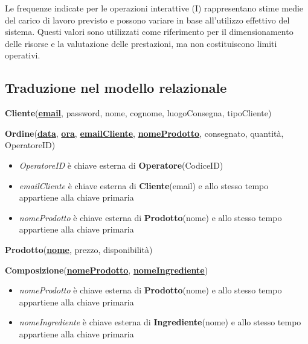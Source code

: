 \documentclass[12pt,a4paper]{article}
\begin{document}
    \FloatBarrier
    \begin{tcolorbox}[
        colback=yellow!10, 
        colframe=yellow!50!black, 
        title=\faExclamationTriangle \quad Nota 
    ]
        Le frequenze indicate per le operazioni interattive (I) rappresentano stime medie del carico di lavoro previsto e possono variare in base all'utilizzo effettivo del sistema. Questi valori sono utilizzati come riferimento per il dimensionamento delle risorse e la valutazione delle prestazioni, ma non costituiscono limiti operativi.
    \end{tcolorbox}
    
    \subsection{Traduzione nel modello relazionale}
    \begin{tcolorbox}[
        colback=gray!8,
        colframe=black!30,
        title=
    ]
        \textbf{Cliente}(\textbf{\uline{email}}, password, nome, cognome, luogoConsegna, tipoCliente)
    \end{tcolorbox}

    \begin{tcolorbox}[
        colback=gray!8,
        colframe=black!30,
        title=
    ]
        \textbf{Ordine}(\uline{\textbf{data}}, \textbf{\uline{ora}}, \textbf{\uline{emailCliente}}, \textbf{\uline{nomeProdotto}}, consegnato, quantità, OperatoreID)
        \begin{itemize}[leftmargin=1em]
            \item \textit{OperatoreID} è chiave esterna di \textbf{Operatore}(CodiceID)
            \item \textit{emailCliente} è chiave esterna di \textbf{Cliente}(email) e allo stesso tempo appartiene alla chiave primaria
            \item \textit{nomeProdotto} è chiave esterna di \textbf{Prodotto}(nome) e allo stesso tempo appartiene alla chiave primaria
        \end{itemize}
    \end{tcolorbox}
    
    \begin{tcolorbox}[
        colback=gray!8,
        colframe=black!30,
        title=
    ]
        \textbf{Prodotto}(\textbf{\uline{nome}}, prezzo, disponibilità)
    \end{tcolorbox}

    \begin{tcolorbox}[
        colback=gray!8,
        colframe=black!30,
        title=
    ]
        \textbf{Composizione}(\textbf{\uline{nomeProdotto}}, \textbf{\uline{nomeIngrediente}})
        \begin{itemize}[leftmargin=1em]
            \item \textit{nomeProdotto} è chiave esterna di \textbf{Prodotto}(nome) e allo stesso tempo appartiene alla chiave primaria
            \item \textit{nomeIngrediente} è chiave esterna di \textbf{Ingrediente}(nome) e allo stesso tempo appartiene alla chiave primaria
        \end{itemize}
    \end{tcolorbox}
\end{document}
